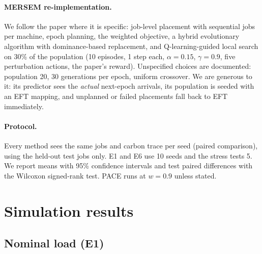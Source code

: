 \documentclass[11pt,a4paper]{article}
\begin{document}
\paragraph{MERSEM re-implementation.} We follow the paper where it is specific: job-level placement with sequential jobs per machine, epoch planning, the weighted objective, a hybrid evolutionary algorithm with dominance-based replacement, and Q-learning-guided local search on 30\% of the population (10 episodes, 1 step each, $\alpha=0.15$, $\gamma=0.9$, five perturbation actions, the paper's reward). Unspecified choices are documented: population 20, 30 generations per epoch, uniform crossover. We are generous to it: its predictor sees the \emph{actual} next-epoch arrivals, its population is seeded with an EFT mapping, and unplanned or failed placements fall back to EFT immediately.

\paragraph{Protocol.} Every method sees the same jobs and carbon trace per seed (paired comparison), using the held-out test jobs only. E1 and E6 use 10 seeds and the stress tests 5. We report means with 95\% confidence intervals and test paired differences with the Wilcoxon signed-rank test. PACE runs at $w=0.9$ unless stated.

\section{Simulation results}\label{sec:sim}

\subsection{Nominal load (E1)}
\end{document}
